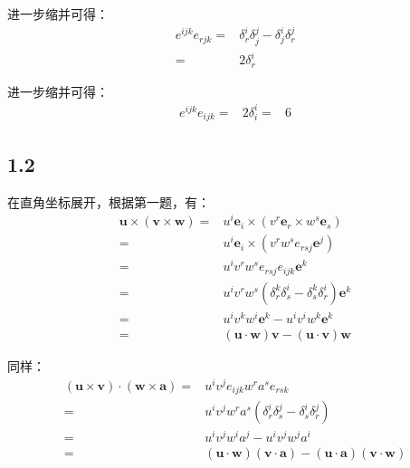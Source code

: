 \documentclass[UTF8,zihao=5]{ctexart}
\begin{document}
进一步缩并可得：
\begin{equation*}
    \begin{aligned}
        e^{ijk}e_{rjk}
    =&\delta^i_r\delta^j_j -
    \delta^i_j\delta^j_r \\
    =&2\delta^i_r
    \end{aligned}
\end{equation*}

进一步缩并可得：
\begin{equation*}
    \begin{aligned}
        e^{ijk}e_{ijk}
    =&2\delta^i_i
    =&6
    \end{aligned}
\end{equation*}

\subsection*{1.2}
在直角坐标展开，根据第一题，有：
\begin{equation*}
    \begin{aligned}
        \bm{u}\times(\bm{v}\times\bm{w})
        =&
        u^i\bm{e}_i\times(v^r\bm{e}_r\times w^s\bm{e}_s)\\
        =&
        u^i\bm{e}_i\times(v^r w^s e_{rsj}\bm{e}^j)\\
        =&
        u^i v^r w^s e_{rsj}e_{ijk}\bm{e}^k\\
        =&
        u^i v^r w^s (\delta^k_r\delta^i_s-\delta^k_s\delta^i_r)
        \bm{e}^k\\
        =&
        u^i v^k w^i \bm{e}^k- u^i v^i w^k\bm{e}^k\\
        =&
        (\bm{u}\cdot\bm{w})\bm{v}-(\bm{u}\cdot\bm{v})\bm{w}
    \end{aligned}
\end{equation*}

同样：
\begin{equation*}
    \begin{aligned}
        (\bm{u}\times\bm{v})\cdot(\bm{w}\times\bm{a})
        =&
        u^iv^je_{ijk}w^ra^se_{rsk}\\
        =&
        u^iv^jw^ra^s(\delta^i_r\delta^j_s -
        \delta^i_s\delta^j_r)\\
        =&
        u^iv^jw^ia^j-u^iv^jw^ja^i\\
        =&
        (\bm{u}\cdot\bm{w})(\bm{v}\cdot\bm{a})-
        (\bm{u}\cdot\bm{a})(\bm{v}\cdot\bm{w})
    \end{aligned}
\end{equation*}
\end{document}
